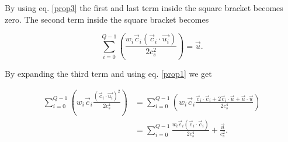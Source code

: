 By using eq. \ref{prop3} the first and last term inside the square bracket 
becomes zero. The second term inside the square bracket becomes

\begin{equation}
    \sum_{i=0}^{Q-1} 
    \left( \frac{w_i\vec{c}_i(\vec{c}_i \cdot \vec{u_i})}{2c_s^2}
    \right) = \vec{u}.
\end{equation}

By expanding the third term and using eq. \ref{prop1} we get

\begin{align}
    \sum_{i=0}^{Q-1} 
    \left( w_i\vec{c}_i\frac{(\vec{c}_i \cdot \vec{u_i})^2}{2c_s^4}
    \right) &=
    \sum_{i=0}^{Q-1} 
    \left( w_i\vec{c}_i\frac{\vec{c}_i\cdot\vec{c}_i + 2\vec{c}_i\cdot\vec{u} + \vec{u}\cdot\vec{u}}{2c_s^4}
    \right)\\
    &= \sum_{i=0}^{Q-1} \frac{w_i\vec{c}_i(\vec{c}_i \cdot \vec{c}_i)}{2c_s^4} + \frac{\vec{u}}{c_s^2}.
\end{align}


